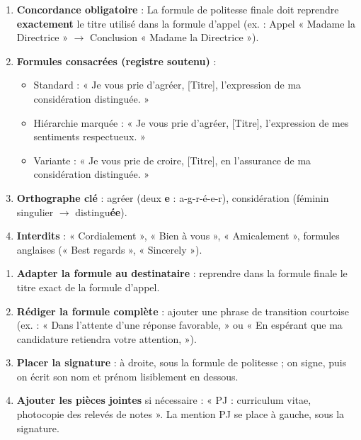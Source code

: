 \documentclass[11pt]{article}
\newcommand{\cle}[1]{{\popxbold\color{popdark}#1}}
\begin{document}
\begin{propriete}
\begin{enumerate}
\item \textbf{Concordance obligatoire} : La formule de politesse finale doit reprendre \textbf{exactement} le titre utilisé dans la formule d'appel (ex. : Appel « Madame la Directrice » $\rightarrow$ Conclusion « Madame la Directrice »).
\item \textbf{Formules consacrées (registre soutenu)} :
\begin{itemize}
\item Standard : « Je vous prie d'agréer, [Titre], l'expression de ma considération distinguée. »
\item Hiérarchie marquée : « Je vous prie d'agréer, [Titre], l'expression de mes sentiments respectueux. »
\item Variante : « Je vous prie de croire, [Titre], en l'assurance de ma considération distinguée. »
\end{itemize}
\item \textbf{Orthographe clé} : \cle{agréer} (deux \textbf{e} : a-g-r-é-e-r), \cle{considération} (féminin singulier $\rightarrow$ distingu\textbf{ée}).
\item \textbf{Interdits} : « Cordialement », « Bien à vous », « Amicalement », formules anglaises (« Best regards », « Sincerely »).
\end{enumerate}
\end{propriete}

\begin{methode}
\begin{enumerate}
\item \textbf{Adapter la formule au destinataire} : reprendre dans la formule finale le titre exact de la formule d'appel.
\item \textbf{Rédiger la formule complète} : ajouter une phrase de transition courtoise (ex. : « Dans l'attente d'une réponse favorable, » ou « En espérant que ma candidature retiendra votre attention, »).
\item \textbf{Placer la signature} : à droite, sous la formule de politesse ; on signe, puis on écrit son nom et prénom lisiblement en dessous.
\item \textbf{Ajouter les pièces jointes} si nécessaire : « PJ : curriculum vitae, photocopie des relevés de notes ». La mention PJ se place à gauche, sous la signature.
\end{enumerate}
\end{methode}
\end{document}
